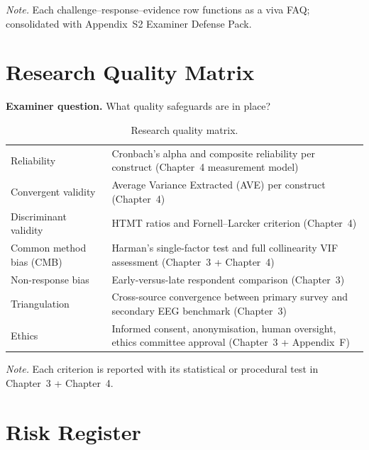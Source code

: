 \vspace{0.3em}\noindent\textit{Note.} Each challenge--response--evidence row functions as a viva FAQ; consolidated with Appendix~S2 Examiner Defense Pack.


\section{Research Quality Matrix}
\label{app:distinction_quality_matrix}

\noindent\textbf{Examiner question.} What quality safeguards are in place?

{\tablestripes\tablefontsize
{}
\begin{xltabular}{\textwidth}{@{} >{\raggedright\arraybackslash}p{4.5cm} L @{}}
\caption[Research quality matrix]{Research quality matrix.}\label{tab:dist_quality_matrix} \\
\toprule
{} &  \\
\midrule
\endfirsthead
\endhead
\bottomrule
\endlastfoot
Reliability & Cronbach's alpha and composite reliability per construct (Chapter~4 measurement model) \\
\addlinespace
Convergent validity & Average Variance Extracted (AVE) per construct (Chapter~4) \\
\addlinespace
Discriminant validity & HTMT ratios and Fornell--Larcker criterion (Chapter~4) \\
\addlinespace
Common method bias (CMB) & Harman's single-factor test and full collinearity VIF assessment (Chapter~3 + Chapter~4) \\
\addlinespace
Non-response bias & Early-versus-late respondent comparison (Chapter~3) \\
\addlinespace
Triangulation & Cross-source convergence between primary survey and secondary EEG benchmark (Chapter~3) \\
\addlinespace
Ethics & Informed consent, anonymisation, human oversight, ethics committee approval (Chapter~3 + Appendix~F) \\
\end{xltabular}}

\vspace{0.3em}\noindent\textit{Note.} Each criterion is reported with its statistical or procedural test in Chapter~3 + Chapter~4.


\section{Risk Register}
\label{app:distinction_risk_register}

